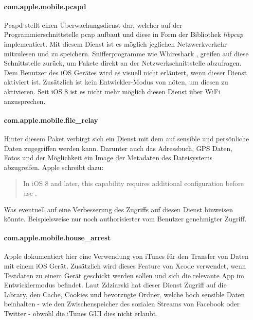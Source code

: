 		\paragraph{com.apple.mobile.pcapd}
			Pcapd stellt einen Überwachungsdienst dar, welcher auf der
			Programmierschnittstelle
			pcap \cite{PCAP2015} aufbaut und
			diese in Form der Bibliothek \textsl{libpcap} implementiert. Mit diesem
			Dienst ist es möglich jeglichen Netzwerkverkehr mitzulesen und zu speichern.
			Snifferprogramme wie Whireshark \cite{WHIRESHARK2015}, greifen auf
			diese Schnittstelle zurück, um Pakete direkt an der Netzwerkschnittstelle
			abzufragen. Dem Benutzer des iOS Gerätes wird es visuell nicht erläutert,
			wenn dieser Dienst aktiviert ist. Zusätzlich ist kein Entwickler-Modus von
			nöten, um diesen zu aktivieren. Seit iOS 8 ist es nicht mehr möglich diesen
			Dienst über WiFi anzusprechen.
		\paragraph{com.apple.mobile.file\_relay}
			Hinter diesem Paket verbirgt sich ein Dienst mit dem auf sensible und
			persönliche Daten zugegriffen werden kann. Darunter auch das Adressbuch, GPS
			Daten, Fotos und der Möglichkeit ein Image der Metadaten des Dateisystems
			abzugreifen. Apple schreibt dazu:
			\begin{quote}
				In iOS 8 and later, this capability requires additional configuration before
				use \cite{AppleDiagnosticCap2015}.
			\end{quote}
			Was eventuell auf eine Verbesserung des Zugriffs auf diesen Dienst hinweisen
			könnte. Beispielsweise nur noch authorisierter vom Benutzer genehmigter
			Zugriff.
		\paragraph{com.apple.mobile.house\_arrest}
			Apple dokumentiert hier eine Verwendung von iTunes für den Transfer von Daten
			mit einem iOS Gerät. Zusätzlich wird dieses Feature von Xcode verwendet,
			wenn Testdaten zu einem Gerät geschickt werden sollen und sich die relevante
			App im Entwicklermodus befindet. Laut Zdziarski hat dieser Dienst Zugriff auf
			die Library, den Cache, Cookies und bevorzugte Ordner, welche hoch sensible
			Daten beinhalten - wie den Zwischenspeicher des sozialen Streams von Facebook
			oder Twitter - obwohl die iTunes GUI dies nicht erlaubt.
			
